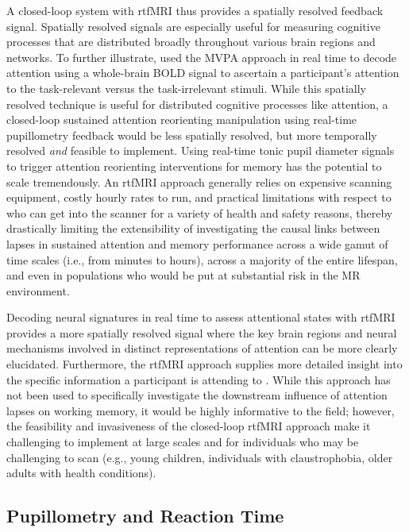 A closed-loop system with rtfMRI thus provides a spatially resolved feedback signal. Spatially resolved signals are especially useful for measuring cognitive processes that are distributed broadly throughout various brain regions and networks. To further illustrate, \textcite{debettencourt2015closed} used the MVPA approach in real time to decode attention using a whole-brain BOLD signal to ascertain a participant's attention to the task-relevant versus the task-irrelevant stimuli. While this spatially resolved technique is useful for distributed cognitive processes like attention, a closed-loop sustained attention reorienting manipulation using real-time pupillometry feedback would be less spatially resolved, but more temporally resolved \emph{and} feasible to implement. Using real-time tonic pupil diameter signals to trigger attention reorienting interventions for memory has the potential to scale tremendously. An rtfMRI approach generally relies on expensive scanning equipment, costly hourly rates to run, and practical limitations with respect to who can get into the scanner for a variety of health and safety reasons, thereby drastically limiting the extensibility of investigating the causal links between lapses in sustained attention and memory performance across a wide gamut of time scales (i.e., from minutes to hours), across a majority of the entire lifespan, and even in populations who would be put at substantial risk in the MR environment.

Decoding neural signatures in real time to assess attentional states with rtfMRI provides a more spatially resolved signal where the key brain regions and neural mechanisms involved in distinct representations of attention can be more clearly elucidated. Furthermore, the rtfMRI approach supplies more detailed insight into the specific information a participant is attending to \parencite{debettencourt2015closed}. While this approach has not been used to specifically investigate the downstream influence of attention lapses on working memory, it would be highly informative to the field; however, the feasibility and invasiveness of the closed-loop rtfMRI approach make it challenging to implement at large scales and for individuals who may be challenging to scan (e.g., young children, individuals with claustrophobia, older adults with health conditions).

\subsection{Pupillometry and Reaction Time}

